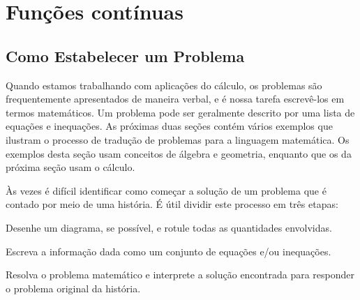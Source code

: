 \graphicspath{ {./figuras/03_continuity/} }
\chapter{Funções contínuas}
\label{chp:continuity}

\section{Como Estabelecer um Problema}
\label{sec:howtoproblem}

Quando estamos trabalhando com aplicações do cálculo, os problemas são
frequentemente apresentados de maneira verbal, e é nossa tarefa escrevê-los
em termos matemáticos. Um problema pode ser geralmente descrito por uma
lista de equações e inequações. As próximas duas seções contém vários
exemplos que ilustram o processo de tradução de problemas para a linguagem
matemática. Os exemplos desta seção usam conceitos de álgebra e geometria,
enquanto que os da próxima seção usam o cálculo.

Às vezes é difícil identificar como começar a solução de um problema que
é contado por meio de uma história. É útil dividir este processo em três
etapas:
\begin{stepanalysis}
\item Desenhe um diagrama, se possível, e rotule todas as quantidades
      envolvidas.
\item Escreva a informação dada como um conjunto de equações e/ou
      inequações.
\item Resolva o problema matemático e interprete a solução encontrada
      para responder o problema original da história.
\end{stepanalysis}


